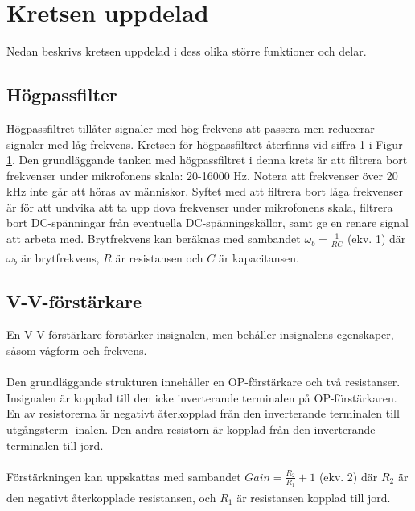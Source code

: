 \documentclass[12pt]{report}
\begin{document}
\section{Kretsen uppdelad}
\label{sec:parts}
Nedan beskrivs kretsen uppdelad i dess olika större funktioner och delar.

\subsection{Högpassfilter}
\label{subsec:filter}
Högpassfiltret tillåter signaler med hög frekvens att passera men reducerar signaler med låg frekvens. Kretsen för högpassfiltret återfinns vid siffra 1 i \hyperref[fig:circuit]{Figur 1}. Den grundläggande tanken med högpassfiltret i denna krets är att filtrera bort frekvenser under mikrofonens skala: 20-16000 Hz. Notera att frekvenser över 20 kHz inte går att höras av människor. Syftet med att filtrera bort låga frekvenser är för att undvika att ta upp dova frekvenser under mikrofonens skala, filtrera bort DC-spänningar från eventuella DC-spänningskällor, samt ge en renare signal att arbeta med. Brytfrekvens kan beräknas med sambandet $\omega_b=\frac{1}{R C}$ \label{eq:wb}(ekv. 1) där $\omega_b$ är brytfrekvens, $R$ är resistansen och $C$ är kapacitansen\textsuperscript{\cite{hambley}}.

\subsection{V-V-förstärkare}
\label{subsec:ampl}
En V-V-förstärkare förstärker insignalen, men behåller insignalens egenskaper, såsom vågform och frekvens.
\\\\
Den grundläggande strukturen innehåller en OP-förstärkare och två resistanser. Insignalen är kopplad till den icke inverterande terminalen på OP-förstärkaren. En av resistorerna är negativt återkopplad från den inverterande terminalen till utgångsterm- inalen. Den andra resistorn är kopplad från den inverterande terminalen till jord. 
\\\\
Förstärkningen kan uppskattas med sambandet $Gain = \frac{R_2}{R_1}+1$ \label{eq:gain}(ekv. 2) där $R_2$ är den negativt återkopplade resistansen, och $R_1$ är resistansen kopplad till jord.\textsuperscript{\cite{hambley}}

\end{document}
